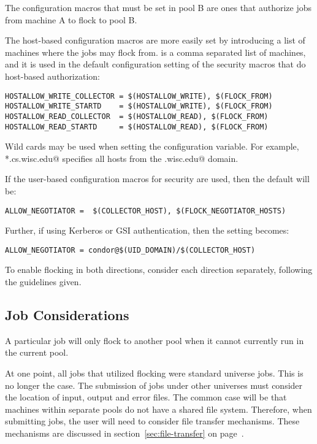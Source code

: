 The configuration macros that must be set in 
pool B are ones that authorize jobs from machine A
to flock to pool B.

The host-based configuration macros are more easily
set by introducing a list of machines where the jobs may flock from. 
 is a comma separated list of machines,
and  it is used in the default configuration setting
of the security macros that do host-based authorization:
\footnotesize
\begin{verbatim}
HOSTALLOW_WRITE_COLLECTOR = $(HOSTALLOW_WRITE), $(FLOCK_FROM)
HOSTALLOW_WRITE_STARTD    = $(HOSTALLOW_WRITE), $(FLOCK_FROM)
HOSTALLOW_READ_COLLECTOR  = $(HOSTALLOW_READ), $(FLOCK_FROM)
HOSTALLOW_READ_STARTD     = $(HOSTALLOW_READ), $(FLOCK_FROM)
\end{verbatim}
\normalsize

Wild cards may be used when setting the 
configuration variable.
For example, \verb@*.cs.wisc.edu@ specifies all hosts
from the \verb@cs.wisc.edu@ domain. 

If the user-based configuration macros for security are used,
then the default will be:
\footnotesize
\begin{verbatim}
ALLOW_NEGOTIATOR =  $(COLLECTOR_HOST), $(FLOCK_NEGOTIATOR_HOSTS)
\end{verbatim}
\normalsize

Further, if using Kerberos or GSI authentication, then the setting
becomes:
\footnotesize
\begin{verbatim}
ALLOW_NEGOTIATOR = condor@$(UID_DOMAIN)/$(COLLECTOR_HOST)
\end{verbatim}
\normalsize

To enable flocking in both directions, consider each direction
separately, following the guidelines given.

\subsection{\label{sec:Jobs-Flocking}Job Considerations}

A particular job will only flock to another pool
when it cannot currently run in the current pool.

At one point, all jobs that utilized flocking were standard
universe jobs.
This is no longer the case.
The submission of jobs under other universes must consider
the location of input, output and error files.
The common case will be that machines within separate pools
do not have a shared file system.
Therefore, when submitting jobs, the user will need to consider
file transfer mechanisms.
These mechanisms are discussed in
section~\ref{sec:file-transfer} on page~\pageref{sec:file-transfer}.
